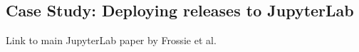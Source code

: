 \subsection{Case Study: Deploying releases to JupyterLab}

Link to main JupyterLab paper by Frossie et al.
